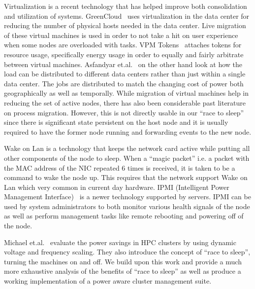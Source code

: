 Virtualization is a recent technology that has helped improve both consolidation and utilization of systems. GreenCloud~\cite{Liu:09} uses virtualization in the data center for reducing the number of physical hosts needed in the data center. Live migration of these virtual machines is used in order to not take a hit on user experience when some nodes are overloaded with tasks. VPM Tokens~\cite{Ripal:08} attaches tokens for resource usage, specifically energy usage in order to equally and fairly arbitrate between virtual machines. Asfandyar et.al.~\cite{Asfandyar:09} on the other hand look at how the load can be distributed to different data centers rather than just within a single data center. The jobs are distributed to match the changing cost of power both geographically as well as temporally. While migration of virtual machines help in reducing the set of active nodes, there has also been considerable past literature~\cite{tcpcp, mosix} on process migration. However, this is not directly usable in our ``race to sleep'' since there is significant state persistent on the host node and it is usually required to have the former node running and forwarding events to the new node.

Wake on Lan\cite{wol,irwt} is a technology that keeps the network card active while putting all other components of the node to sleep. When a ``magic packet'' i.e. a packet with the MAC address of the NIC repeated 6 times is received, it is taken to be a command to wake the node up. This requires that the network support Wake on Lan which very common in current day hardware. IPMI (Intelligent Power Management Interface)~\cite{ipmi} is a newer technology supported by servers. IPMI can be used by system administrators to both monitor various health signals of the node as well as perform management tasks like remote rebooting and powering off of the node.

Michael et.al.~\cite{Michael:09} evaluate the power savings in HPC clusters by using dynamic voltage and frequency scaling. They also introduce the concept of ``race to sleep'', turning the machines on and off. We build upon this work and provide a much more exhaustive analysis of the benefits of ``race to sleep'' as well as produce a working implementation of a power aware cluster management suite.



